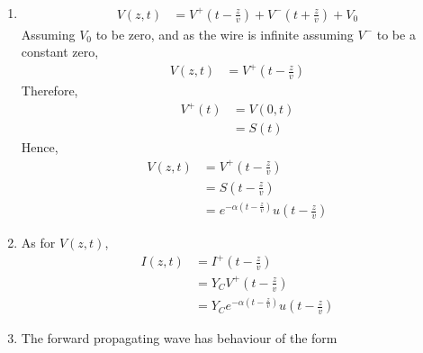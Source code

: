 \documentclass[titlepage, fleqn, a4paper, 12pt, twoside]{article}
\theoremstyle{definition}
\theoremstyle{theorem}
\begin{document}
\begin{solution}
	\begin{enumerate}
		\item
			\begin{align*}
				V(z,t) &= V^+\left( t - \frac{z}{v} \right) + V^-\left( t + \frac{z}{v} \right) + V_0
			\end{align*}
			Assuming $V_0$ to be zero, and as the wire is infinite assuming $V^-$ to be a constant zero,
			\begin{align*}
				V(z,t) &= V^+\left( t - \frac{z}{v} \right)
			\end{align*}
			Therefore,
			\begin{align*}
				V^+(t) &= V(0,t)\\
				&= S(t)
			\end{align*}
			Hence,
			\begin{align*}
				V(z,t) &= V^+\left( t - \frac{z}{v} \right)\\
				&= S\left( t - \frac{z}{v} \right)\\
				&= e^{-\alpha \left( t - \frac{z}{v} \right)} u\left( t - \frac{z}{v} \right)
			\end{align*}
		\item
			As for $V(z,t)$,
			\begin{align*}
				I(z,t) &= I^+\left( t - \frac{z}{v} \right)\\
				&= Y_C V^+\left( t - \frac{z}{v} \right)\\
				&= Y_C e^{-\alpha \left( t - \frac{z}{v} \right)} u\left( t - \frac{z}{v} \right)
			\end{align*}
		\item
			The forward propagating wave has behaviour of the form
			\begin{figure}[H]
				\centering
			\end{figure}
			\begin{figure}[H]
				\centering
\end{figure}
\end{enumerate}
\end{solution}
\end{document}
